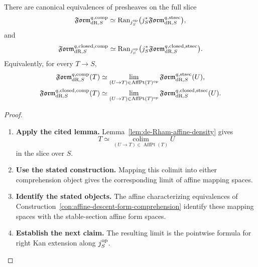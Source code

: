 \begin{proposition}
\label{prop:form-comprehension-right-kan}
There are canonical equivalences of presheaves on the full slice
\[
  \mathfrak{Form}^{q,\mathrm{comp}}_{\mathrm{dR},S}
  \simeq
  \operatorname{Ran}_{j_S^{\mathrm{op}}}
  \bigl(
    j_S^*\mathfrak{Form}^{q,\mathrm{stsec}}_{\mathrm{dR},S}
  \bigr),
\]
and
\[
  \mathfrak{Form}^{q,\mathrm{closed},\mathrm{comp}}_{\mathrm{dR},S}
  \simeq
  \operatorname{Ran}_{j_S^{\mathrm{op}}}
  \bigl(
    j_S^*
    \mathfrak{Form}^{q,\mathrm{closed},\mathrm{stsec}}_{\mathrm{dR},S}
  \bigr).
\]
Equivalently, for every \(T\to S\),
\[
\begin{aligned}
  \mathfrak{Form}^{q,\mathrm{comp}}_{\mathrm{dR},S}(T)
  &\simeq
  \operatorname*{lim}_{(U\to T)\in\operatorname{AffPt}(T)^{\mathrm{op}}}
  \mathfrak{Form}^{q,\mathrm{stsec}}_{\mathrm{dR},S}(U),\\
  \mathfrak{Form}^{q,\mathrm{closed},\mathrm{comp}}_{\mathrm{dR},S}(T)
  &\simeq
  \operatorname*{lim}_{(U\to T)\in\operatorname{AffPt}(T)^{\mathrm{op}}}
  \mathfrak{Form}^{q,\mathrm{closed},\mathrm{stsec}}_{\mathrm{dR},S}(U).
\end{aligned}
\]
\end{proposition}

\begin{proof}
\leavevmode
\begin{enumerate}[label=\textup{(\arabic*)}]
    \item \textbf{Apply the cited lemma.}
    Lemma~\ref{lem:de-Rham-affine-density} gives
    \[
    T
    \simeq
    \operatorname*{colim}_{(U\to T)\in\operatorname{AffPt}(T)}U
    \]
    in the slice over \(S\).
    \item \textbf{Use the stated construction.}
    Mapping this colimit into either comprehension object
    gives the corresponding limit of affine mapping spaces.
    \item \textbf{Identify the stated objects.}
    The affine characterizing equivalences of
    Construction~\ref{con:affine-descent-form-comprehension} identify these mapping
    spaces with the stable-section affine form spaces.
    \item \textbf{Establish the next claim.}
    The resulting limit is the
    pointwise formula for right Kan extension along \(j_S^{\mathrm{op}}\).
\end{enumerate}
\end{proof}

